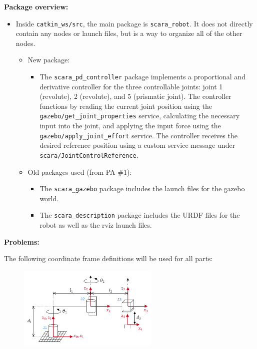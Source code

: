 \documentclass[10pt]{article}
\begin{document}
\setlength{\abovedisplayskip}{6pt}
\setlength{\belowdisplayskip}{3pt}
\setlength{\abovedisplayshortskip}{4pt}
\setlength{\belowdisplayshortskip}{4pt}

\textbf{Package overview:}
\begin{itemize}
	\item Inside \texttt{catkin\_ws/src}, the main package is \texttt{scara\_robot}. It does not directly contain any nodes or launch files, but is a way to organize all of the other nodes.
	\begin{itemize}
		\item New package:
		\begin{itemize}
			\item The \texttt{scara\_pd\_controller} package implements a proportional and derivative controller for the three controllable joints: joint 1 (revolute), 2 (revolute), and 5 (prismatic joint). The controller functions by reading the current joint position using the \\ \texttt{gazebo/get\_joint\_properties} service, calculating the necessary input into the joint, and applying the input force using the \texttt{gazebo/apply\_joint\_effort} service. The controller receives the desired reference position using a custom service message under \texttt{scara/JointControlReference}.
		\end{itemize}
		
		\item Old packages used (from PA \#1):
		\begin{itemize}
			\item The \texttt{scara\_gazebo} package includes the launch files for the gazebo world.
			\item The \texttt{scara\_description} package includes the URDF files for the robot as well as the rviz launch files.
		\end{itemize}
	\end{itemize}
\end{itemize}
\vspace{0.5cm}

\textbf{Problems:}

The following coordinate frame definitions will be used for all parts:

	\begin{figure}[H]
	\centering
	\includegraphics[width=0.6\textwidth]{figures/rrp_manipulator_reference_frames.png}
\end{figure}
\end{document}
